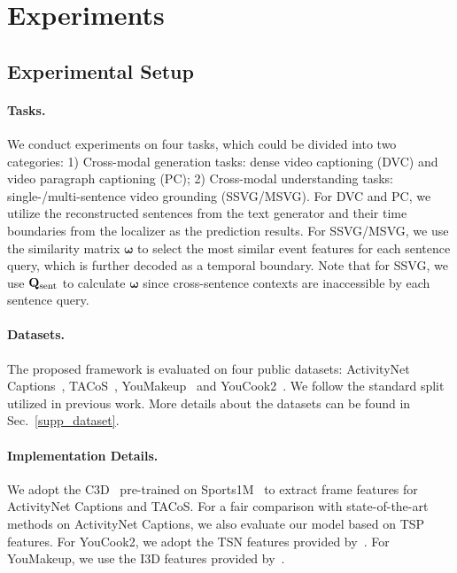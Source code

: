\section{Experiments}
\subsection{Experimental Setup}


\paragraph{Tasks.} We conduct experiments on four tasks, which could be divided into two categories: 1) Cross-modal generation tasks: dense video captioning (DVC) and video paragraph captioning (PC); 2) Cross-modal understanding tasks: single-/multi-sentence video grounding (SSVG/MSVG). For DVC and PC, we utilize the reconstructed sentences from the text generator and their time boundaries from the localizer as the prediction results. For SSVG/MSVG, we use the similarity matrix $\boldsymbol{\omega}$ to select the most similar event features for each sentence query, which is further decoded as a temporal boundary. Note that for SSVG, we use $\mathbf{Q}_{\rm sent}$ to calculate $\boldsymbol{\omega}$ since cross-sentence contexts are inaccessible by each sentence query.

\vspace{-1.0em}
\paragraph{Datasets.} The proposed framework is evaluated on four public datasets: ActivityNet Captions~\cite{krishna2017dense}, TACoS~\cite{regneri2013grounding}, YouMakeup~\cite{wang2019youmakeup} and YouCook2~\cite{zhou2018towards}. We follow the standard split utilized in previous work. More details about the datasets can be found in Sec.~\ref{supp_dataset}.



\vspace{-1.0em}
\paragraph{Implementation Details.}
We adopt the C3D~\cite{tran2015learning} pre-trained on Sports1M~\cite{karpathy2014large} to extract frame features for ActivityNet Captions and TACoS. For a fair comparison with state-of-the-art methods on ActivityNet Captions, we also evaluate our model based on TSP~\cite{wang2018temporal} features. For YouCook2, we adopt the TSN features provided by~\cite{zhou2018end}. For YouMakeup, we use the I3D features provided by~\cite{wang2019youmakeup}.

